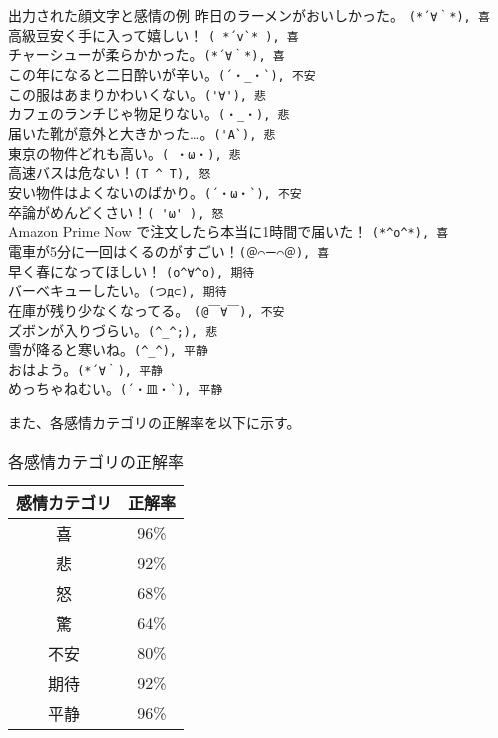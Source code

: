 \documentclass[11pt,a4j]{jsarticle}
\begin{document}
\begin{itembox}[l]{出力された顔文字と感情の例}
  昨日のラーメンがおいしかった。 \verb|(*´∀｀*), 喜| \\
高級豆安く手に入って嬉しい！ \verb|( *´v`* ), 喜| \\
チャーシューが柔らかかった。\verb|(*´∀｀*), 喜|\\
この年になると二日酔いが辛い。\verb|(´・_・`), 不安|\\
この服はあまりかわいくない。\verb|('∀'), 悲|\\
カフェのランチじゃ物足りない。\verb|(・_・), 悲|\\
届いた靴が意外と大きかった…。\verb|('A`), 悲|\\
東京の物件どれも高い。\verb|( ・ω・), 悲|\\
高速バスは危ない！\verb|(T ^ T), 怒|\\
安い物件はよくないのばかり。\verb|(´・ω・`), 不安|\\
卒論がめんどくさい！\verb|( 'ω' ), 怒|\\
Amazon Prime Now で注文したら本当に1時間で届いた！ \verb|(*^o^*), 喜|\\
電車が5分に一回はくるのがすごい！\verb|(＠⌒ー⌒＠), 喜|\\
早く春になってほしい！ \verb|(o^∀^o), 期待|\\
バーベキューしたい。\verb|(つд⊂), 期待|\\
在庫が残り少なくなってる。 \verb|(@￣∀￣), 不安|\\
ズボンが入りづらい。\verb|(^_^;), 悲|\\
雪が降ると寒いね。\verb|(^_^), 平静|\\
おはよう。\verb|(*´∀｀), 平静|\\
めっちゃねむい。\verb|(´・皿・`), 平静|\\
\end{itembox}

また、各感情カテゴリの正解率を以下に示す。

\begin{table}
  \caption{各感情カテゴリの正解率}
  \centering
  \begin{tabular}{|c|c|} \hline
    感情カテゴリ & 正解率 \\ \hline \hline
    喜 & 96\% \\ \hline
    悲 & 92\% \\  \hline
    怒 & 68\% \\ \hline
    驚 & 64\% \\ \hline
    不安 & 80\% \\ \hline
    期待 & 92\% \\ \hline
    平静 & 96\% \\ \hline
  \end{tabular}
\end{table}
\end{document}
